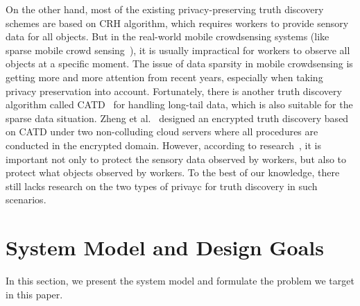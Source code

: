 \documentclass[conference]{IEEEtran}
\begin{document}
On the other hand, most of the existing privacy-preserving truth discovery schemes are based on CRH algorithm, which requires workers to provide sensory data for all objects.
But in the real-world mobile crowdsensing systems (like sparse mobile crowd sensing~\cite{wang_sparse_2016}), it is usually impractical for workers to observe all objects at a specific moment.
The issue of data sparsity in mobile crowdsensing is getting more and more attention from recent years, especially when taking privacy preservation into account.
Fortunately, there is another truth discovery algorithm called CATD~\cite{li_confidence-aware_2014} for handling long-tail data, which is also suitable for the sparse data situation.
Zheng et al.~\cite{zheng_learning_2018} designed an encrypted truth discovery based on CATD under two non-colluding cloud servers where all procedures are conducted in the encrypted domain.
However, according to research~\cite{wang_sparse_2020}, it is important not only to protect the sensory data observed by workers, but also to protect what objects observed by workers.
To the best of our knowledge, there still lacks research on the two types of privayc for truth discovery in such scenarios.

\section{System Model and Design Goals}\label{sec3}
In this section, we present the system model and formulate the problem we target in this paper.
\end{document}
